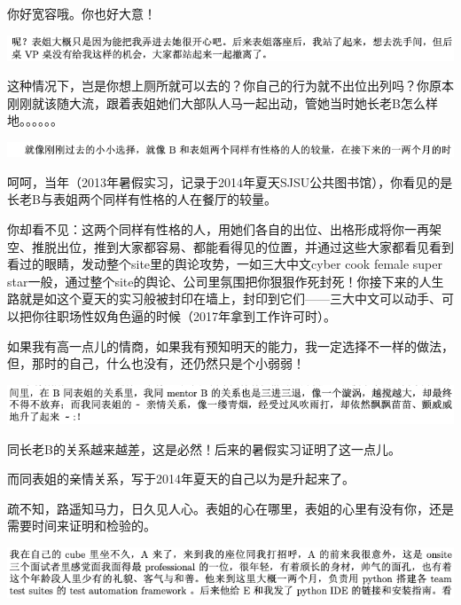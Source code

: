 \documentclass[9pt, b5paper]{article}
\begin{document}
你好宽容哦。你也好大意！

\begin{center}
\includegraphics[width=.9\linewidth]{./pic/backups_plans_20210504_215213.png}
\end{center}

这种情况下，岂是你想上厕所就可以去的？你自己的行为就不出位出列吗？你原本刚刚就该随大流，跟着表姐她们大部队人马一起出动，管她当时她长老B怎么样地。。。。。。

\begin{center}
\includegraphics[width=.9\linewidth]{./pic/backups_plans_20210505_112052.png}
\end{center}

呵呵，当年（2013年暑假实习，记录于2014年夏天SJSU公共图书馆），你看见的是长老B与表姐两个同样有性格的人在餐厅的较量。

你却看不见：这两个同样有性格的人，用她们各自的出位、出格形成将你一再架空、推脱出位，推到大家都容易、都能看得见的位置，并通过这些大家都看见看到看过的眼睛，发动整个site里的舆论攻势，一如三大中文cyber cook female super star一般，通过整个site的舆论、公司里氛围把你狠狠作死封死！你接下来的人生路就是如这个夏天的实习般被封印在墙上，封印到它们——三大中文可以动手、可以把你往职场性奴角色逼的时候（2017年拿到工作许可时）。

如果我有高一点儿的情商，如果我有预知明天的能力，我一定选择不一样的做法，但，那时的自己，什么也没有，还仍然只是个小弱弱！

\begin{center}
\includegraphics[width=.9\linewidth]{./pic/backups_plans_20210505_112203.png}
\end{center}

同长老B的关系越来越差，这是必然！后来的暑假实习证明了这一点儿。

而同表姐的亲情关系，写于2014年夏天的自己以为是升起来了。

疏不知，路遥知马力，日久见人心。表姐的心在哪里，表姐的心里有没有你，还是需要时间来证明和检验的。 

\begin{center}
\includegraphics[width=.9\linewidth]{./pic/backups_plans_20210504_215428.png}
\end{center}
\end{document}
